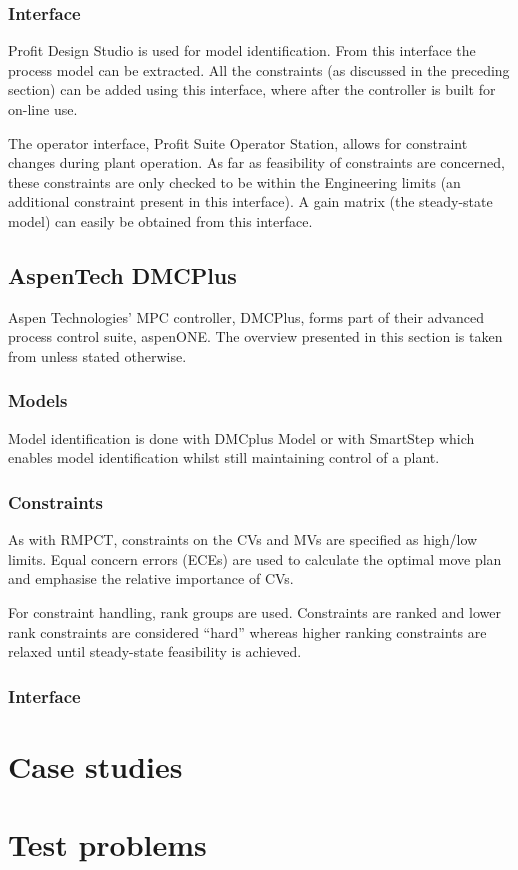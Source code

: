 \subsubsection{Interface}
Profit Design Studio is used for model identification.
From this interface the process model can be extracted.
All the constraints (as discussed in the preceding section) can be added using this interface, where after the controller is built for on-line use.

The operator interface, Profit Suite Operator Station, allows for constraint changes during plant operation.
As far as feasibility of constraints are concerned, these constraints are only checked to be within the Engineering limits (an additional constraint present in this interface).
A gain matrix (the steady-state model) can easily be obtained from this interface.


\subsection{AspenTech DMCPlus}
Aspen Technologies' MPC controller, DMCPlus, forms part of their advanced process control suite, aspenONE.
The overview presented in this section is taken from \citet{aspentech1} unless stated otherwise.

\subsubsection{Models}
Model identification is done with DMCplus Model or with SmartStep which enables model identification whilst still maintaining control of a plant.

\subsubsection{Constraints}
As with RMPCT, constraints on the CVs and MVs are specified as high/low limits.
Equal concern errors (ECEs) are used to calculate the optimal move plan and emphasise the relative importance of CVs.

For constraint handling, rank groups are used.
Constraints are ranked and lower rank constraints are considered ``hard'' whereas higher ranking constraints are relaxed until steady-state feasibility is achieved.

\subsubsection{Interface}

\section{Case studies}

\section{Test problems}

